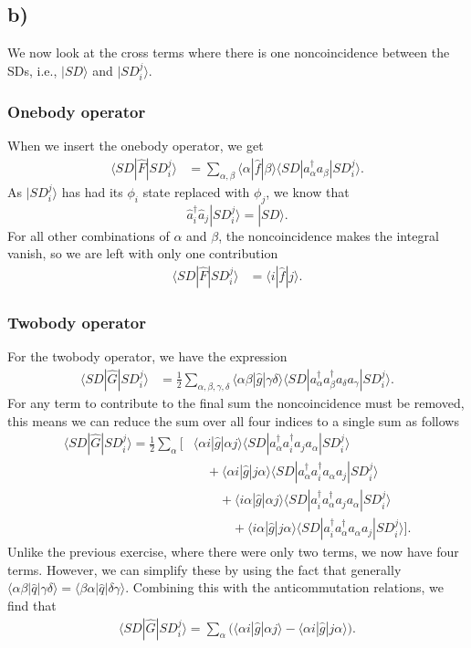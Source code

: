 \documentclass[a4paper, 11pt, notitlepage, english]{article}
\newcommand{\ket}[1]{|#1 \rangle}
\newcommand{\op}[1]{\hat{#1}}
\newcommand{\braopket}[3]{\langle #1 | {#2} | #3 \rangle}
\begin{document}
\subsection*{b)}
We now look at the cross terms where there is one noncoincidence between the SDs, i.e., $\ket{SD}$ and $\ket{SD_i^j}$. 

\subsubsection*{Onebody operator}
When we insert the onebody operator, we get
\begin{align*}
\braopket{SD}{\op{F}}{SD_i^j} 
&= \sum_{\alpha, \beta} \braopket{\alpha}{\op{f}}{\beta}\braopket{SD}{a_\alpha^\dag a_\beta}{SD_i^j}.
\end{align*}
As $\ket{SD_i^j}$ has had its $\phi_i$ state replaced with $\phi_j$, we know that
$$\op{a}_i^\dag \op{a}_j\ket{SD_i^j} = \ket{SD}.$$
For all other combinations of $\alpha$ and $\beta$, the noncoincidence makes the integral vanish, so we are left with only one contribution
\begin{align*}
\braopket{SD}{\op{F}}{SD_i^j} 
&= \braopket{i}{\op{f}}{j}.
\end{align*}

\subsubsection*{Twobody operator}
For the twobody operator, we have the expression
\begin{align*}
\braopket{SD}{\op{G}}{SD_i^j}
&= \frac{1}{2}\sum_{\alpha, \beta, \gamma, \delta} \braopket{\alpha\beta}{\op{g}}{\gamma\delta}\braopket{SD}{a_\alpha^\dag a_\beta^\dag a_\delta a_\gamma}{SD_i^j}.
\end{align*}
For any term to contribute to the final sum the noncoincidence must be removed, this means we can reduce the sum over all four indices to a single sum as follows
\begin{align*}
\braopket{SD}{\op{G}}{SD_i^j}
= \frac{1}{2}\sum_{\alpha} \big[
&\braopket{\alpha i}{\op{g}}{\alpha j}\braopket{SD}{a_\alpha^\dag a_i^\dag a_j a_\alpha}{SD_i^j} \\[-0.3cm]
&\quad+ \braopket{\alpha i}{\op{g}}{j \alpha}\braopket{SD}{a_\alpha^\dag a_i^\dag a_\alpha a_j}{SD_i^j} \\
&\qquad+ \braopket{i \alpha}{\op{g}}{\alpha j}\braopket{SD}{a_i^\dag a_\alpha^\dag a_j a_\alpha}{SD_i^j} \\
&\qquad\quad+ \braopket{i \alpha}{\op{g}}{j \alpha}\braopket{SD}{a_i^\dag a_\alpha^\dag a_\alpha a_j}{SD_i^j}\big].
\end{align*}
Unlike the previous exercise, where there were only two terms, we now have four terms. However, we can simplify these by using the fact that generally $\braopket{\alpha\beta}{\op{q}}{\gamma\delta} = \braopket{\beta\alpha}{\op{q}}{\delta\gamma}$. Combining this with the anticommutation relations, we find that 
\begin{align*}
\braopket{SD}{\op{G}}{SD_i^j}
= \sum_{\alpha} \bigg(\braopket{\alpha i}{\op{g}}{\alpha j} - \braopket{\alpha i}{\op{g}}{j \alpha}\bigg).
\end{align*}
\end{document}
